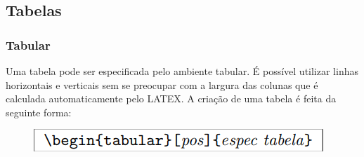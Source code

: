 \documentclass[12pt]{article}
\begin{document}
		\subsection{Tabelas}
		
				\subsubsection{Tabular}
					Uma tabela pode ser especificada pelo ambiente tabular. É possível utilizar linhas horizontais e verticais sem se preocupar com a largura das colunas que é calculada automaticamente pelo LATEX. A criação de uma tabela é feita da seguinte forma:
					\begin{figure}[h]
						\centering
						\includegraphics[scale=0.45]{t.png}
					\end{figure}
		
\end{document}
